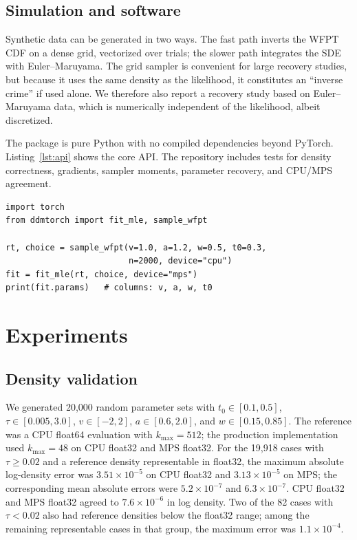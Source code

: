 \documentclass[11pt]{article}
\begin{document}
\subsection{Simulation and software}

Synthetic data can be generated in two ways. The fast path inverts the WFPT CDF on a dense grid, vectorized over trials; the slower path integrates the SDE with Euler--Maruyama. The grid sampler is convenient for large recovery studies, but because it uses the same density as the likelihood, it constitutes an ``inverse crime'' if used alone. We therefore also report a recovery study based on Euler--Maruyama data, which is numerically independent of the likelihood, albeit discretized.

The package is pure Python with no compiled dependencies beyond PyTorch. Listing~\ref{lst:api} shows the core API. The repository includes tests for density correctness, gradients, sampler moments, parameter recovery, and CPU/MPS agreement.

\begin{lstlisting}[caption={Minimal \texttt{ddmtorch} workflow.},label={lst:api}]
import torch
from ddmtorch import fit_mle, sample_wfpt

rt, choice = sample_wfpt(v=1.0, a=1.2, w=0.5, t0=0.3,
                         n=2000, device="cpu")
fit = fit_mle(rt, choice, device="mps")
print(fit.params)   # columns: v, a, w, t0
\end{lstlisting}

\section{Experiments}

\subsection{Density validation}
\label{sec:density-validation}

We generated 20,000 random parameter sets with $t_0\in[0.1,0.5]$, $\tau\in[0.005,3.0]$, $v\in[-2,2]$, $a\in[0.6,2.0]$, and $w\in[0.15,0.85]$. The reference was a CPU float64 evaluation with $k_{\max}=512$; the production implementation used $k_{\max}=48$ on CPU float32 and MPS float32. For the 19,918 cases with $\tau\ge0.02$ and a reference density representable in float32, the maximum absolute log-density error was $3.51\times10^{-5}$ on CPU float32 and $3.13\times10^{-5}$ on MPS; the corresponding mean absolute errors were $5.2\times10^{-7}$ and $6.3\times10^{-7}$. CPU float32 and MPS float32 agreed to $7.6\times10^{-6}$ in log density. Two of the 82 cases with $\tau<0.02$ also had reference densities below the float32 range; among the remaining representable cases in that group, the maximum error was $1.1\times10^{-4}$.
\end{document}
